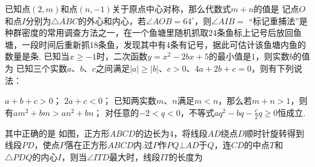 \documentclass[10pt]{article}
\begin{document}
\begin{questions}{\complitingintroduction}
    \question 已知点$(2,m)$和点$(n,-1)$关于原点中心对称，那么代数式$m+n$的值是\complitingline
    \question 记点$O$和点$I$分别为$\triangle ABC$的外心和内心，若$\angle AOB=64^{\circ}$，则$\angle AIB=$\complitingline
    \question “标记重捕法”是种群密度的常用调查方法之一，在一个鱼塘里随机抓取$24$条鱼标上记号后放回鱼塘，一段时间后重新抓$18$条鱼，发现其中有$4$条有记号，据此可估计该鱼塘内鱼的数量是\complitingline 条.
    \question 已知当$x \geq -1$时，二次函数$y=x^2-2bx+5$的最小值是$1$，则实数$b$的值为\complitingline
    \question 已知三个实数$a$、$b$、$c$之间满足$|a| \geq |b|$、$c>0$、$4a+2b+c=0$，则有下列说法：
    \begin{subsubquestions}
        \subsubquestion $a+b+c>0$；
        \subsubquestion $2a+c<0$；
        \subsubquestion 已知两实数$m$、$n$满足$m<n$，那么若$m+n>1$，则有$am^2+bm>an^2+bn$；
        \subsubquestion 对任意的$-2<q<0$，不等式$aq^2-bq-\frac{c}{2}q \geq 0$恒成立.
    \end{subsubquestions}
    其中正确的是\complitingline
    \question 如图，正方形$ABCD$的边长为$4$，将线段$AD$绕点$D$顺时针旋转得到线段$PD$，使点$P$落在正方形$ABCD$内.过$P$作$PQ \bot AD$于$Q$，连$CD$的中点$T$和$\triangle PDQ$的内心$I$，则当$\angle ITD$最大时，线段$IT$的长度为\complitingline
    \begin{figure}[!htb]
        \raggedleft
    \end{figure}
\end{questions}
\end{document}
